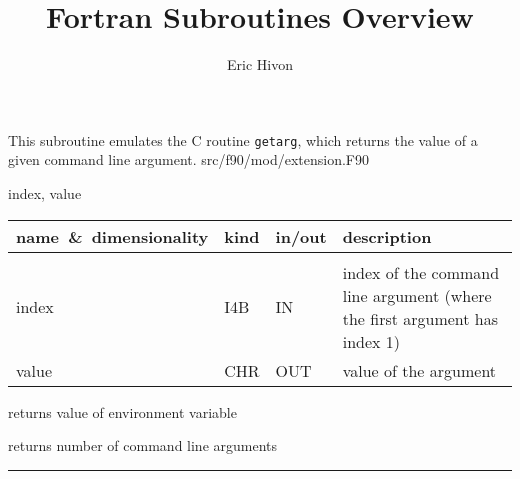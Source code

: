 \sloppy

\title{\healpix Fortran Subroutines Overview}
 \section[getArgument]{ }
\label{sub:getargument}
\author{Eric Hivon}

\begin{facility}
{This subroutine emulates the C routine {\tt getarg}, which returns the value of
a given command line argument.}
{src/f90/mod/extension.F90}
\end{facility}

\begin{f90format}
{index, value}
\end{f90format}

\begin{arguments}
{
\begin{tabular}{p{0.3\hsize} p{0.05\hsize} p{0.1\hsize} p{0.45\hsize}} \hline  
\textbf{name~\&~dimensionality} & \textbf{kind} & \textbf{in/out} & \textbf{description} \\ \hline
                   &   &   &                           \\ %
index & I4B & IN & index of the command line argument (where the first argument
                   has index 1) \\
value & CHR & OUT & value of the argument 
\end{tabular}}
\end{arguments}


\begin{related}
  \begin{sulist}{} %
  \item[\htmlref{getEnvironment}{sub:getenvironment}] returns value of
  environment variable
  \item[\htmlref{nArguments}{sub:narguments}] returns number of command line arguments
  \end{sulist}
\end{related}

\rule{\hsize}{2mm}

\newpage
